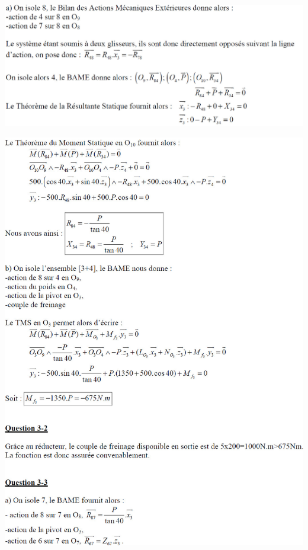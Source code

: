 \documentclass[10pt,fleqn]{article} %
\begin{document}
\newpage 

\begin{center}
\includegraphics[width=\linewidth]{images/cor_01}
\end{center}
\begin{center}
\includegraphics[width=\linewidth]{images/cor_02}
\end{center}
\end{document}
